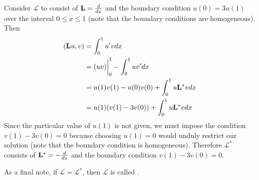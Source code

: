 \begin{example}
	Consider \(\mathcal{L}\) to consist of \(\mathrm{\bf{L}}=\frac{d}{dx}\) and the boundary condition \(u(0)=3u(1)\) over the interval \(0\leq x \leq 1\) (note that the boundary conditions are homogeneous).  Then
	\begin{equation}
		\begin{split}
			(\mathrm{\bf{L}} u,v) &= \int_0^1u'vdx\\
			       &= (uv)\biggr\rvert_0^1 - \int_0^1 uv'dx\\
			       &= u(1)v(1)-u(0)v(0)+\int_0^1u\mathrm{\bf{L^*}} vdx\\
			       &= u(1)(v(1)-3v(0)) + \int_0^1u\mathrm{\bf{L^*}} vdx
		\end{split}
	\end{equation}
	Since the particular value of \(u(1)\) is not given, we must impose the condition \(v(1)-3v(0)=0\) because choosing \(u(1)=0\) would unduly restrict our solution (note that the boundary condition is homogeneous). Therefore \(\mathcal{L^*}\) consists of \(\mathrm{\bf{L^*}} = -\frac{d}{dx}\) and the boundary condition \(v(1) - 3v(0)=0\). 
\end{example}As a final note, if \(\mathcal{L}=\mathcal{L}^*\), then \(\mathcal{L}\) is called .
